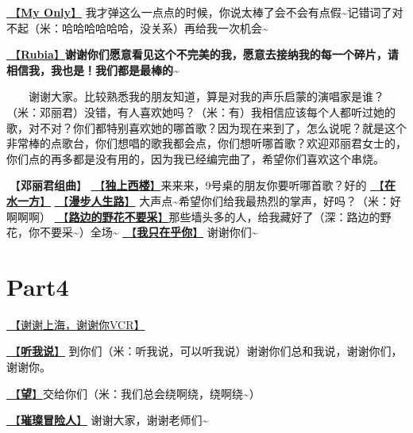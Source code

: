 \documentclass[]{ctexbook}
\begin{document}
\hyperref[my-only]{🎵【\textbf{My Only}】} 我才弹这么一点点的时候，你说太棒了会不会有点假\textasciitilde 记错词了对不起（米：哈哈哈哈哈哈，没关系）再给我一次机会\textasciitilde{}

\hyperref[rubia]{🎵【\textbf{Rubia}】}\textbf{谢谢你们愿意看见这个不完美的我，愿意去接纳我的每一个碎片，请相信我，我也是！我们都是最棒的\textasciitilde{}}

  谢谢大家。比较熟悉我的朋友知道，算是对我的声乐启蒙的演唱家是谁？（米：邓丽君）没错，有人喜欢她吗？（米：有）我相信应该每个人都听过她的歌，对不对？你们都特别喜欢她的哪首歌？因为现在来到了，怎么说呢？就是这个非常棒的点歌台，你们想唱的歌我都会点，你们想听哪首歌？欢迎邓丽君女士的，你们点的再多都是没有用的，因为我已经编完曲了，希望你们喜欢这个串烧。

🎵【\textbf{邓丽君组曲}】
\hyperref[one-in-the-building]{🎵【\textbf{独上西楼}】}来来来，9号桌的朋友你要听哪首歌？好的
\hyperref[on-the-water-side]{🎵【\textbf{在水一方}】}
\hyperref[walk-the-road-of-life]{🎵【\textbf{漫步人生路}】} 大声点\textasciitilde 希望你们给我最热烈的掌声，好吗？（米：好啊啊啊）
\hyperref[only-with-me]{🎵【\textbf{路边的野花不要采}】}那些墙头多的人，给我藏好了（深：路边的野花，你不要采\textasciitilde）全场\textasciitilde{}
\hyperref[only-you]{🎵【\textbf{我只在乎你}】} 谢谢你们\textasciitilde{}

\section{Part4}\label{shanghai-20240519-part4}

\hyperref[thank-you-vcr]{🎥【谢谢上海，谢谢你VCR】}

\hyperref[listen-to-me]{🎵【\textbf{听我说}】} 到你们（米：听我说，可以听我说）谢谢你们总和我说，谢谢你们，谢谢你。

\hyperref[hope]{🎵【\textbf{望}】}交给你们（米：我们总会绕啊绕，绕啊绕\textasciitilde）

\hyperref[adventurers]{🎵【\textbf{璀璨冒险人}】} 谢谢大家，谢谢老师们\textasciitilde{}
\end{document}
